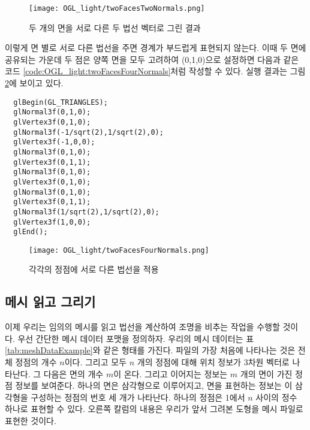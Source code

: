 \begin{figure}[h!]
  \centering
    \texttt{[image: OGL\_light/twoFacesTwoNormals.png]}
    \caption{두 개의 면을 서로 다른 두 법선 벡터로 그린 결과}
    \label{fig:OGL_light:twoFacesTwoNormals}
\end{figure}

이렇게 면 별로 서로 다른 법선을 주면 경계가 부드럽게 표현되지 않는다. 이때 두 면에 공유되는 가운데 
두 점은 양쪽 면을 모두 고려하여 (0,1,0)으로 설정하면 다음과 같은 코드 \ref{code:OGL_light:twoFacesFourNormals}처럼 작성할 수 있다.
 실행 결과는 그림 \ref{fig:OGL_light:twoFacesFourNormals}에 보이고 있다.

\begin{algorithmbis}[공유된 점에 공통 법선 부여]\label{code:OGL_light:twoFacesFourNormals}
\lstset{language=C++} 
\begin{lstlisting}
  glBegin(GL_TRIANGLES);
  glNormal3f(0,1,0);  
  glVertex3f(0,1,0);
  glNormal3f(-1/sqrt(2),1/sqrt(2),0);  
  glVertex3f(-1,0,0);
  glNormal3f(0,1,0);  
  glVertex3f(0,1,1);
  glNormal3f(0,1,0);  
  glVertex3f(0,1,0);
  glNormal3f(0,1,0);  
  glVertex3f(0,1,1);
  glNormal3f(1/sqrt(2),1/sqrt(2),0);  
  glVertex3f(1,0,0);
  glEnd();
\end{lstlisting}
\end{algorithmbis}

\begin{figure}[h!]
  \centering
    \texttt{[image: OGL\_light/twoFacesFourNormals.png]}
    \caption{각각의 정점에 서로 다른 법선을 적용}
    \label{fig:OGL_light:twoFacesFourNormals}
\end{figure}

\subsection{메시 읽고 그리기}

이제 우리는 임의의 메시를 읽고 법선을 계산하여 조명을 비추는 작업을 수행할 것이다.
우선 간단한 메시 데이터 포맷을 정의하자. 
우리의 메시 데이터는 표 \ref{tab:meshDataExample}와 같은 형태를 가진다. 
파일의 가장 처음에 나타나는 것은 전체 정점의 개수 $n$이다. 
그리고 모두 $n$ 개의 정점에 대해 위치 정보가 3차원 벡터로 나타난다.
그 다음은 면의 개수 $m$이 온다. 그리고 이어지는 정보는
$m$ 개의 면이 가진 정점 정보를 보여준다.
하나의 면은 삼각형으로 이루어지고, 면을 표현하는 정보는 이 삼각형을 구성하는
정점의 번호 세 개가 나타난다.
하나의 정점은 1에서 $n$ 사이의 정수 하나로 표현할 수 있다. 
오른쪽 칼럼의 내용은 우리가 앞서 그려본 도형을 메시 파일로 표현한 것이다.


